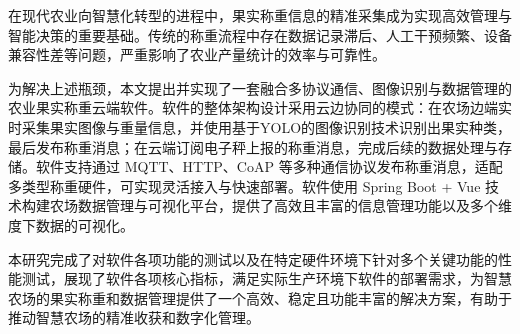 在现代农业向智慧化转型的进程中，果实称重信息的精准采集成为实现高效管理与智能决策的重要基础。传统的称重流程中存在数据记录滞后、人工干预频繁、设备兼容性差等问题，严重影响了农业产量统计的效率与可靠性。

为解决上述瓶颈，本文提出并实现了一套融合多协议通信、图像识别与数据管理的农业果实称重云端软件。软件的整体架构设计采用云边协同的模式：在农场边端实时采集果实图像与重量信息，并使用基于YOLO的图像识别技术识别出果实种类，最后发布称重消息；在云端订阅电子秤上报的称重消息，完成后续的数据处理与存储。软件支持通过 MQTT、HTTP、CoAP 等多种通信协议发布称重消息，适配多类型称重硬件，可实现灵活接入与快速部署。软件使用 Spring Boot + Vue 技术构建农场数据管理与可视化平台，提供了高效且丰富的信息管理功能以及多个维度下数据的可视化。

本研究完成了对软件各项功能的测试以及在特定硬件环境下针对多个关键功能的性能测试，展现了软件各项核心指标，满足实际生产环境下软件的部署需求，为智慧农场的果实称重和数据管理提供了一个高效、稳定且功能丰富的解决方案，有助于推动智慧农场的精准收获和数字化管理。 

